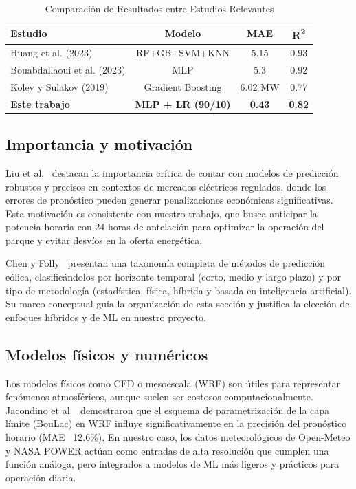 \documentclass[conference]{IEEEtran}
\begin{document}
\begin{table}[htbp]
	\caption{Comparación de Resultados entre Estudios Relevantes}
	\centering
	\begin{tabular}{@{}lccc@{}}
		\toprule
		\textbf{Estudio} & \textbf{Modelo} & \textbf{MAE} & \textbf{R\textsuperscript{2}} \\ \midrule
		Huang et al. (2023)     & RF+GB+SVM+KNN   & 5.15       & 0.93 \\
		Bouabdallaoui et al. (2023) & MLP                  & 5.3        & 0.92 \\
		Kolev y Sulakov (2019)  & Gradient Boosting     & 6.02 MW    & 0.77 \\
		\textbf{Este trabajo}   & \textbf{MLP + LR (90/10)} & \textbf{0.43} & \textbf{0.82} \\
		\bottomrule
	\end{tabular}
	\label{tab:comparacion-resultados}
\end{table}


	
\subsection{Importancia y motivación}
	
Liu et al.~\cite{liu2023day} destacan la importancia crítica de contar con modelos de predicción robustos y precisos en contextos de mercados eléctricos regulados, donde los errores de pronóstico pueden generar penalizaciones económicas significativas. Esta motivación es consistente con nuestro trabajo, que busca anticipar la potencia horaria con 24 horas de antelación para optimizar la operación del parque y evitar desvíos en la oferta energética.
	
Chen y Folly~\cite{chen2018wind} presentan una taxonomía completa de métodos de predicción eólica, clasificándolos por horizonte temporal (corto, medio y largo plazo) y por tipo de metodología (estadística, física, híbrida y basada en inteligencia artificial). Su marco conceptual guía la organización de esta sección y justifica la elección de enfoques híbridos y de ML en nuestro proyecto.
	
\subsection{Modelos físicos y numéricos}
	
Los modelos físicos como CFD o mesoescala (WRF) son útiles para representar fenómenos atmosféricos, aunque suelen ser costosos computacionalmente. Jacondino et al.~\cite{jacondino2021hourly} demostraron que el esquema de parametrización de la capa límite (BouLac) en WRF influye significativamente en la precisión del pronóstico horario (MAE ~12.6\%). En nuestro caso, los datos meteorológicos de Open-Meteo y NASA POWER actúan como entradas de alta resolución que cumplen una función análoga, pero integrados a modelos de ML más ligeros y prácticos para operación diaria.
	
\end{document}
